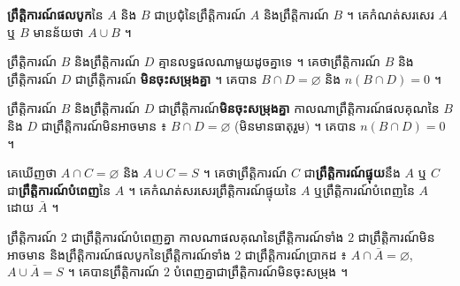 \begin{definition}[និយមន័យ]
\textbf{ព្រឹត្តិការណ៍ផលបូក}នៃ $A$ និង $B$ ជាប្រជុំនៃព្រឹត្តិការណ៍ $A$ និងព្រឹត្តិការណ៍ $B$ ។ គេកំណត់សរសេរ $A$ ឬ $B$ មានន័យថា $A \cup B$ ។
\end{definition}

ព្រឹត្តិការណ៍ $B$ និងព្រឹត្តិការណ៍ $D$ គ្មានលទ្ធផលណាមួយដូចគ្នាទេ ។ គេថាព្រឹត្តិការណ៍ $B$ និងព្រឹត្តិការណ៍ $D$ ជាព្រឹត្តិការណ៍ \textbf{មិនចុះសម្រុងគ្នា} ។ គេបាន $B \cap D = \varnothing$ និង $n(B \cap D) = 0$ ។

\begin{definition}[និយមន័យ]
ព្រឹត្តិការណ៍ $B$ និងព្រឹត្តិការណ៍ $D$ ជាព្រឹត្តិការណ៍\textbf{មិនចុះសម្រុងគ្នា} កាលណាព្រឹត្តិការណ៍ផលគុណនៃ $B$ និង $D$ ជាព្រឹត្តិការណ៍មិនអាចមាន ៖ $B \cap D = \varnothing$ (មិនមានធាតុរួម) ។ គេបាន $n(B \cap D) = 0$ ។
\end{definition}

គេឃើញថា $A \cap C = \varnothing$ និង $A \cup C = S$ ។ គេថាព្រឹត្តិការណ៍ $C$ ជា\textbf{ព្រឹត្តិការណ៍ផ្ទុយ}នឹង $A$ ឬ $C$ ជា\textbf{ព្រឹត្តិការណ៍បំពេញ}នៃ $A$ ។ គេកំណត់សរសេរព្រឹត្តិការណ៍ផ្ទុយនៃ $A$ ឬព្រឹត្តិការណ៍បំពេញនៃ $A$ ដោយ $\bar{A}$ ។

ព្រឹត្តិការណ៍ $2$ ជាព្រឹត្តិការណ៍បំពេញគ្នា កាលណាផលគុណនៃព្រឹត្តិការណ៍ទាំង $2$ ជាព្រឹត្តិការណ៍មិនអាចមាន និងព្រឹត្តិការណ៍ផលបូកនៃព្រឹត្តិការណ៍ទាំង $2$ ជាព្រឹត្តិការណ៍ប្រាកដ ៖ $A \cap \bar{A} = \varnothing$, $A \cup \bar{A} = S$ ។ គេបានព្រឹត្តិការណ៍ $2$ បំពេញគ្នាជាព្រឹត្តិការណ៍មិនចុះសម្រុង ។

